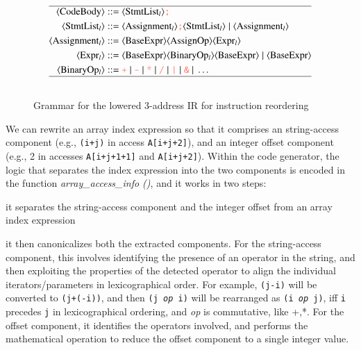 \begin{figure}[t!]
  \footnotesize
  \begin{align}
    \hline
    \langle\text{CodeBody}\rangle ::=& \;  \langle\text{StmtList$_l$}\rangle {\color{tablecolor!60}\texttt{;}} \nonumber \\
    \langle\text{StmtList$_l$}\rangle ::=& \; \langle\text{Assignment$_l$}\rangle {\color{tablecolor!60}\texttt{;}} \langle\text{StmtList$_l$}\rangle \; | \; \langle\text{Assignment$_l$}\rangle \nonumber \\
    \langle\text{Assignment$_l$}\rangle ::=& \; \langle\text{BaseExpr}\rangle \langle\text{AssignOp}\rangle \langle\text{Expr$_l$}\rangle \nonumber \\
    \langle\text{Expr$_l$}\rangle ::=& \; \langle\text{BaseExpr}\rangle \langle\text{BinaryOp$_l$}\rangle \langle\text{BaseExpr}\rangle \; | \; \langle\text{BaseExpr}\rangle \nonumber \\
    \langle\text{BinaryOp$_l$}\rangle ::=& \; {\color{tablecolor!60}\texttt{+}} \; | \; {\color{tablecolor!60}\texttt{-}} \; | \; {\color{tablecolor!60}\texttt{*}} \; | \; {\color{tablecolor!60}\texttt{/}} \; | \; {\color{tablecolor!60}\texttt{|}} \; | \; {\color{tablecolor!60}\texttt{\&}} \; | \; \ldots \nonumber  \\
    \hline \nonumber
  \end{align}
   \vspace*{-0.6cm}
  \caption{Grammar for the lowered 3-address IR for instruction reordering}
\label{fig:lower-grammar}
\end{figure}


We can rewrite an array index expression so that it comprises an
string-access component (e.g., \texttt{(i+j)} in access \texttt{A[i+j+2]}),
and an integer offset component (e.g., 2 in accesses \texttt{A[i+j+1+1]} and
\texttt{A[i+j+2]}).  Within the code generator, the logic that separates the
index expression into the two components is encoded in the function
\textit{array\_access\_info ()}, and it works in two steps: 


\begin{compactenum}
\item it separates the string-access component and the integer offset from an
array index expression
\item it then canonicalizes both the extracted components. For the
string-access component, this involves identifying the presence of an operator
in the string, and then exploiting the properties of the detected operator to
align the individual iterators/parameters in lexicographical order. For
example, \texttt{(j-i)} will be converted to \texttt{(j+(-i))}, and then
\texttt{(j \textit{op} i)} will be rearranged as \texttt{(i \textit{op} j)}, iff
\texttt{i} precedes \texttt{j} in lexicographical ordering, and \textit{op} is
commutative, like +,*. For the offset component, it identifies the operators
involved, and performs the mathematical operation to reduce the offset
component to a single integer value.
\end{compactenum}

